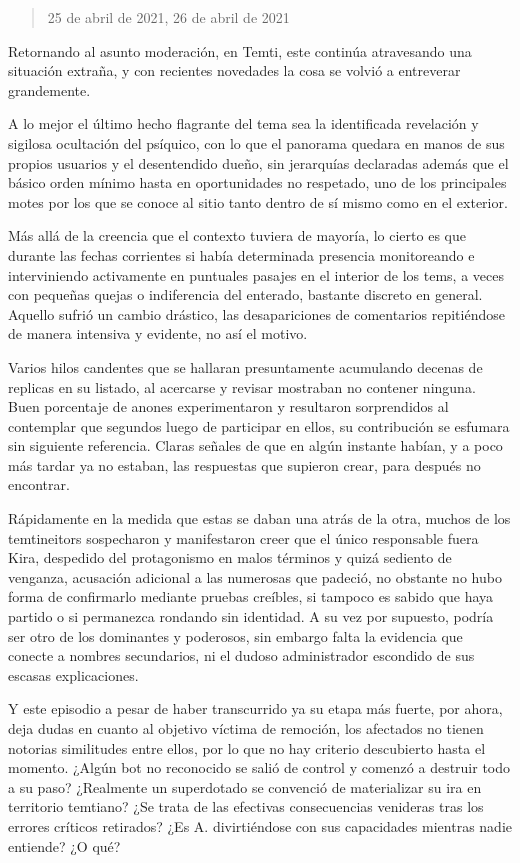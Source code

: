 \documentclass[
]{book}
\begin{document}
\begin{quote}
25 de abril de 2021, 26 de abril de 2021
\end{quote}

Retornando al asunto moderación, en Temti, este continúa atravesando una situación extraña, y con recientes novedades la cosa se volvió a entreverar grandemente.

A lo mejor el último hecho flagrante del tema sea la identificada revelación y sigilosa ocultación del psíquico, con lo que el panorama quedara en manos de sus propios usuarios y el desentendido dueño, sin jerarquías declaradas además que el básico orden mínimo hasta en oportunidades no respetado, uno de los principales motes por los que se conoce al sitio tanto dentro de sí mismo como en el exterior.

Más allá de la creencia que el contexto tuviera de mayoría, lo cierto es que durante las fechas corrientes si había determinada presencia monitoreando e interviniendo activamente en puntuales pasajes en el interior de los tems, a veces con pequeñas quejas o indiferencia del enterado, bastante discreto en general. Aquello sufrió un cambio drástico, las desapariciones de comentarios repitiéndose de manera intensiva y evidente, no así el motivo.

Varios hilos candentes que se hallaran presuntamente acumulando decenas de replicas en su listado, al acercarse y revisar mostraban no contener ninguna. Buen porcentaje de anones experimentaron y resultaron sorprendidos al contemplar que segundos luego de participar en ellos, su contribución se esfumara sin siguiente referencia. Claras señales de que en algún instante habían, y a poco más tardar ya no estaban, las respuestas que supieron crear, para después no encontrar.

Rápidamente en la medida que estas se daban una atrás de la otra, muchos de los temtineitors sospecharon y manifestaron creer que el único responsable fuera Kira, despedido del protagonismo en malos términos y quizá sediento de venganza, acusación adicional a las numerosas que padeció, no obstante no hubo forma de confirmarlo mediante pruebas creíbles, si tampoco es sabido que haya partido o si permanezca rondando sin identidad. A su vez por supuesto, podría ser otro de los dominantes y poderosos, sin embargo falta la evidencia que conecte a nombres secundarios, ni el dudoso administrador escondido de sus escasas explicaciones.

Y este episodio a pesar de haber transcurrido ya su etapa más fuerte, por ahora, deja dudas en cuanto al objetivo víctima de remoción, los afectados no tienen notorias similitudes entre ellos, por lo que no hay criterio descubierto hasta el momento. ¿Algún bot no reconocido se salió de control y comenzó a destruir todo a su paso? ¿Realmente un superdotado se convenció de materializar su ira en territorio temtiano? ¿Se trata de las efectivas consecuencias venideras tras los errores críticos retirados? ¿Es A. divirtiéndose con sus capacidades mientras nadie entiende? ¿O qué?
\end{document}
